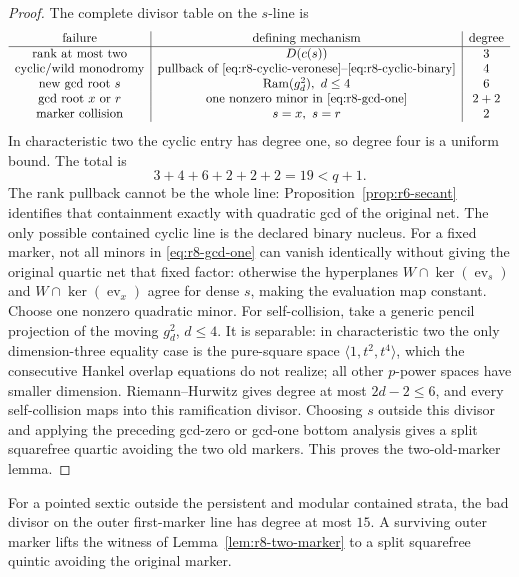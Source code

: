 \begin{proof}
The complete divisor table on the $s$-line is
\[
\begin{array}{c|c|c}
\text{failure}&\text{defining mechanism}&\text{degree}\\\hline
\text{rank at most two}&D(c(s))&3\\
\text{cyclic/wild monodromy}&\text{pullback of
\eqref{eq:r8-cyclic-veronese}--\eqref{eq:r8-cyclic-binary}}&4\\
\text{new gcd root }s&\operatorname{Ram}(g^2_d),\ d\le4&6\\
\text{gcd root }x\text{ or }r&\text{one nonzero minor in
\eqref{eq:r8-gcd-one}}&2+2\\
\text{marker collision}&s=x,\ s=r&2
\end{array}
\]
In characteristic two the cyclic entry has degree one, so degree four
is a uniform bound.  The total is
\begin{equation}\label{eq:r8-inner-budget}
 3+4+6+2+2+2=19<q+1.
\end{equation}
The rank pullback cannot be the whole line:
Proposition~\ref{prop:r6-secant} identifies that containment exactly
with quadratic gcd of the original net.  The only possible contained
cyclic line is the declared binary nucleus.  For a fixed marker, not
all minors in \eqref{eq:r8-gcd-one} can vanish identically without
giving the original
quartic net that fixed factor: otherwise the hyperplanes
$W\cap\ker(\operatorname{ev}_s)$ and
$W\cap\ker(\operatorname{ev}_x)$ agree for dense $s$, making
the evaluation map constant.  Choose one nonzero quadratic minor.
For self-collision, take a generic pencil projection of the moving
$g^2_d$, $d\leq4$.  It is separable: in characteristic two the only
dimension-three equality case is the pure-square space
$\langle1,t^2,t^4\rangle$, which the consecutive Hankel overlap
equations do not realize; all other $p$-power spaces have smaller
dimension.  Riemann--Hurwitz gives degree at most $2d-2\leq6$, and
every self-collision maps into this ramification divisor.
Choosing $s$ outside this divisor and applying the preceding
gcd-zero or gcd-one bottom analysis gives a split squarefree quartic
avoiding the two old markers.  This proves the two-old-marker lemma.
\end{proof}

\begin{lemma}\label{lem:r8-outer-selection}%
%
For a pointed sextic outside the persistent and modular contained
strata, the bad divisor on the outer first-marker line has degree at
most $15$.  A surviving outer marker lifts the witness of
Lemma~\ref{lem:r8-two-marker} to a split squarefree quintic avoiding
the original marker.
\end{lemma}

